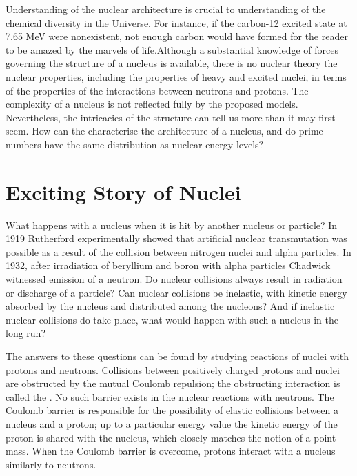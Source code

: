 Understanding of the nuclear architecture is crucial to understanding of the chemical diversity in the Universe. For instance, if the carbon-12 excited state at 7.65 MeV were nonexistent, not enough carbon would have formed for the reader to be amazed by the marvels of life.\cite{bur57}Although a substantial knowledge of forces governing the structure of a nucleus is available, there is no  nuclear theory  the nuclear properties, including the properties of heavy and excited nuclei, in terms of the properties of the interactions between neutrons and protons.\cites{unif}{eis85} The complexity of a  nucleus is not reflected fully by the proposed models. Nevertheless, the intricacies of the structure can tell us more than it may first seem. How can the  characterise the architecture of a nucleus, and do prime numbers have the same distribution as nuclear energy levels?
\section*{Exciting Story of Nuclei}

What happens with a nucleus when it is hit by another nucleus or particle? In 1919 Rutherford experimentally showed that artificial nuclear transmutation was possible as a result of the collision between nitrogen nuclei and alpha particles.\cite{ruth19} In 1932, after irradiation of beryllium and boron with alpha particles Chadwick witnessed emission of a neutron.\cite{ch32} Do nuclear collisions always result in radiation or discharge of a particle? Can nuclear collisions be inelastic, with kinetic energy absorbed by the nucleus and distributed among the nucleons? And if inelastic nuclear collisions do take place, what would happen with such a nucleus in the long run?

The answers to these questions can be found by studying reactions of nuclei with protons and neutrons. Collisions between positively charged protons and nuclei are obstructed by the mutual Coulomb repulsion; the obstructing interaction is called the . No such barrier exists in the nuclear reactions with neutrons. The Coulomb barrier is responsible for the possibility of elastic collisions between a nucleus and a proton; up to a particular energy value the kinetic energy of the proton is shared with the nucleus, which closely matches the notion of a point mass. When the Coulomb barrier is overcome, protons interact with a nucleus similarly to neutrons. 


